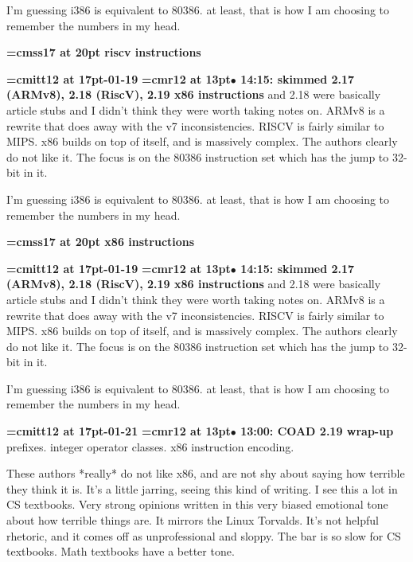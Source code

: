 I'm guessing i386 is equivalent to 80386. at least, that is how I am choosing to remember the numbers in my head.
\par

{\medskip\noindent\bf\font\titlefont=cmss17 at 20pt riscv instructions}\medskip

{\medskip\noindent\bf\font\titlefont=cmitt12 at 17pt-01-19}\medskip
{\smallskip\noindent\bf\font\titlefont=cmr12 at 13pt\titlefont $\bullet$ 14:15: skimmed 2.17 (ARMv8), 2.18 (RiscV), 2.19 x86 instructions} and 2.18 were basically article stubs and I didn't think they were worth taking notes on. ARMv8 is a rewrite that does away with the v7 inconsistencies. RISCV is fairly similar to MIPS. x86 builds on top of itself, and is massively complex. The authors clearly do not like it. The focus is on the 80386 instruction set which has the jump to 32-bit in it.
\par

I'm guessing i386 is equivalent to 80386. at least, that is how I am choosing to remember the numbers in my head.
\par

{\medskip\noindent\bf\font\titlefont=cmss17 at 20pt x86 instructions}\medskip

{\medskip\noindent\bf\font\titlefont=cmitt12 at 17pt-01-19}\medskip
{\smallskip\noindent\bf\font\titlefont=cmr12 at 13pt\titlefont $\bullet$ 14:15: skimmed 2.17 (ARMv8), 2.18 (RiscV), 2.19 x86 instructions} and 2.18 were basically article stubs and I didn't think they were worth taking notes on. ARMv8 is a rewrite that does away with the v7 inconsistencies. RISCV is fairly similar to MIPS. x86 builds on top of itself, and is massively complex. The authors clearly do not like it. The focus is on the 80386 instruction set which has the jump to 32-bit in it.
\par

I'm guessing i386 is equivalent to 80386. at least, that is how I am choosing to remember the numbers in my head.
\par

{\medskip\noindent\bf\font\titlefont=cmitt12 at 17pt-01-21}\medskip
{\smallskip\noindent\bf\font\titlefont=cmr12 at 13pt\titlefont $\bullet$ 13:00: COAD 2.19 wrap-up} prefixes. integer operator classes. x86 instruction encoding.
\par

These authors *really* do not like x86, and are not shy about saying how terrible they think it is. It's a little jarring, seeing this kind of writing. I see this a lot in CS textbooks. Very strong opinions written in this very biased emotional tone about how terrible things are. It mirrors the Linux Torvalds. It's not helpful rhetoric, and it comes off as unprofessional and sloppy. The bar is so slow for CS textbooks. Math textbooks have a better tone.
\par

